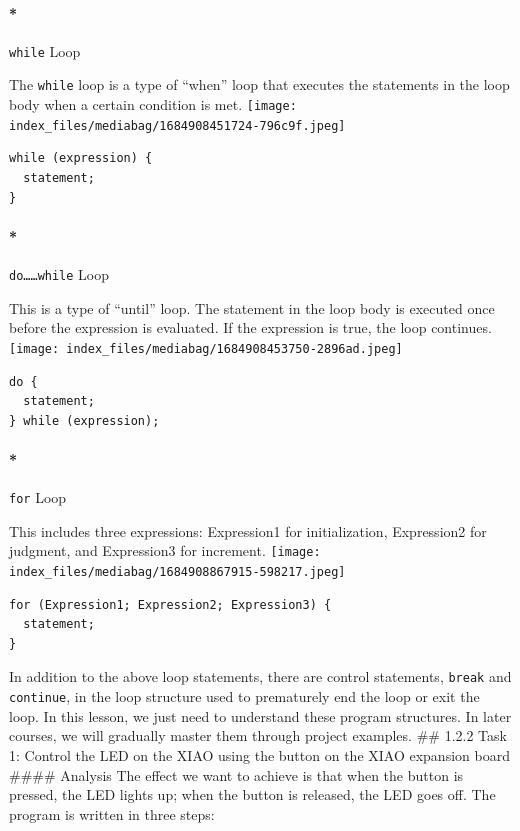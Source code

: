 \documentclass[
  letterpaper,
  DIV=11,
  numbers=noendperiod]{scrreprt}
\let\oldparagraph\paragraph
\renewcommand{\paragraph}[1]{\oldparagraph{#1}\mbox{}}
\begin{document}
\hypertarget{while-loop}{%
\paragraph*{\texorpdfstring{\texttt{while}
Loop}{while Loop}}\label{while-loop}}

The \texttt{while} loop is a type of ``when'' loop that executes the
statements in the loop body when a certain condition is met.
\texttt{[image: index\_files/mediabag/1684908451724-796c9f.jpeg]}

\begin{verbatim}
while (expression) {
  statement;
}
\end{verbatim}

\hypertarget{dowhile-loop}{%
\paragraph*{\texorpdfstring{\texttt{do……while}
Loop}{do\ldots\ldots while Loop}}\label{dowhile-loop}}

This is a type of ``until'' loop. The statement in the loop body is
executed once before the expression is evaluated. If the expression is
true, the loop continues.
\texttt{[image: index\_files/mediabag/1684908453750-2896ad.jpeg]}

\begin{verbatim}
do {
  statement;
} while (expression);
\end{verbatim}

\hypertarget{for-loop}{%
\paragraph*{\texorpdfstring{\texttt{for}
Loop}{for Loop}}\label{for-loop}}

This includes three expressions: Expression1 for initialization,
Expression2 for judgment, and Expression3 for increment.
\texttt{[image: index\_files/mediabag/1684908867915-598217.jpeg]}

\begin{verbatim}
for (Expression1; Expression2; Expression3) {
  statement;
}
\end{verbatim}

In addition to the above loop statements, there are control statements,
\texttt{break} and \texttt{continue}, in the loop structure used to
prematurely end the loop or exit the loop. In this lesson, we just need
to understand these program structures. In later courses, we will
gradually master them through project examples. \#\# 1.2.2 Task 1:
Control the LED on the XIAO using the button on the XIAO expansion board
\#\#\#\# Analysis The effect we want to achieve is that when the button
is pressed, the LED lights up; when the button is released, the LED goes
off. The program is written in three steps:
\end{document}
